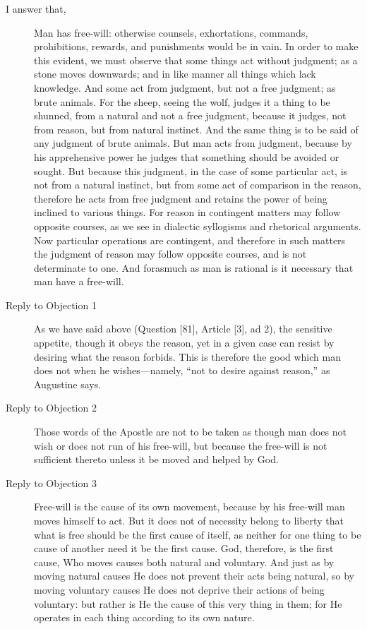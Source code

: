 \documentclass[10pt,article,twoside]{memoir}
\begin{document}
\begin{multicols}{2}
\begin{description}
		\item[I answer that,]  Man has free-will: otherwise counsels, exhortations, commands, prohibitions, rewards, and punishments would be in vain. In order to make this evident, we must observe that some things act without judgment; as a stone moves downwards; and in like manner all things which lack knowledge. And some act from judgment, but not a free judgment; as brute animals. For the sheep, seeing the wolf, judges it a thing to be shunned, from a natural and not a free judgment, because it judges, not from reason, but from natural instinct. And the same thing is to be said of any judgment of brute animals. But man acts from judgment, because by his apprehensive power he judges that something should be avoided or sought. But because this judgment, in the case of some particular act, is not from a natural instinct, but from some act of comparison in the reason, therefore he acts from free judgment and retains the power of being inclined to various things. For reason in contingent matters may follow opposite courses, as we see in dialectic syllogisms and rhetorical arguments. Now particular operations are contingent, and therefore in such matters the judgment of reason may follow opposite courses, and is not determinate to one. And forasmuch as man is rational is it necessary that man have a free-will.
		\item[Reply to Objection 1]  As we have said above (Question [81], Article [3], ad 2), the sensitive appetite, though it obeys the reason, yet in a given case can resist by desiring what the reason forbids. This is therefore the good which man does not when he wishes---namely, ``not to desire against reason,'' as Augustine says.
		\item[Reply to Objection 2]  Those words of the Apostle are not to be taken as though man does not wish or does not run of his free-will, but because the free-will is not sufficient thereto unless it be moved and helped by God.
		\item[Reply to Objection 3] Free-will is the cause of its own movement, because by his free-will man moves himself to act. But it does not of necessity belong to liberty that what is free should be the first cause of itself, as neither for one thing to be cause of another need it be the first cause. God, therefore, is the first cause, Who moves causes both natural and voluntary. And just as by moving natural causes He does not prevent their acts being natural, so by moving voluntary causes He does not deprive their actions of being voluntary: but rather is He the cause of this very thing in them; for He operates in each thing according to its own nature.

\end{description}
\end{multicols}
\end{document}
